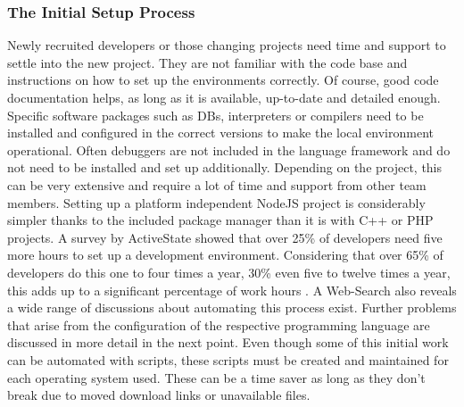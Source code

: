         \subsubsection{The Initial Setup Process}\label{sss::initial}
        Newly recruited developers or those changing projects need time and support to settle into the new project. They are not familiar with the code base and instructions on how to set up the environments correctly. Of course, good code documentation helps, as long as it is available, up-to-date and detailed enough. Specific software packages such as \ac{DB}s, interpreters or compilers need to be installed and configured in the correct versions to make the local environment operational. Often debuggers are not included in the language framework and do not need to be installed and set up additionally. Depending on the project, this can be very extensive and require a lot of time and support from other team members. Setting up a platform independent NodeJS project is considerably simpler thanks to the included package manager  than it is with C++ or PHP projects. A survey by ActiveState showed that over 25\% of developers need five more hours to set up a development environment. Considering that over 65\% of developers do this one to four times a year, 30\% even five to twelve times a year, this adds up to a significant percentage of work hours \cite{setuppain}. A Web-Search also reveals a wide range of discussions about automating this process exist. Further problems that arise from the configuration of the respective programming language are discussed in more detail in the next point. \newline
        Even though some of this initial work can be automated with scripts, these scripts must be created and maintained for each operating system used. These can be a time saver as long as they don't break due to moved download links or unavailable files.

